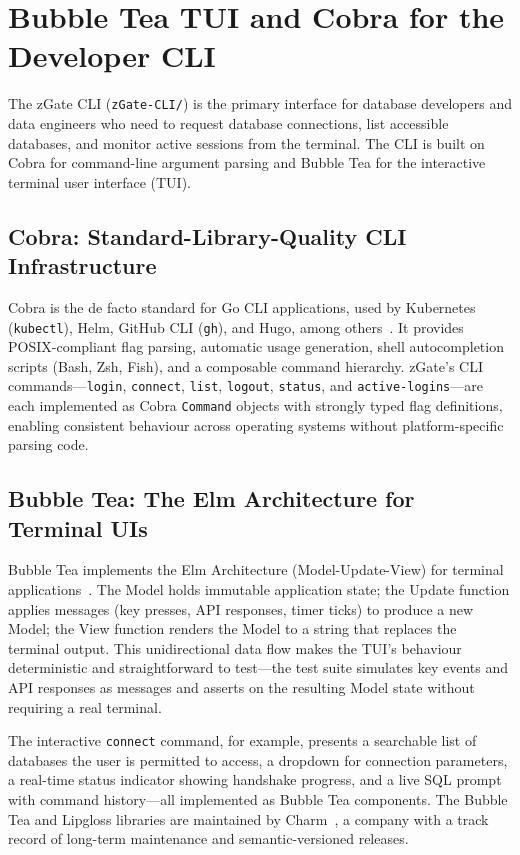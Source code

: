 \section{Bubble Tea TUI and Cobra for the Developer CLI}
\label{sec:cli}

The zGate CLI (\texttt{zGate-CLI/}) is the primary interface for database developers and data engineers who need to request database connections, list accessible databases, and monitor active sessions from the terminal. The CLI is built on Cobra for command-line argument parsing and Bubble Tea for the interactive terminal user interface (TUI).

\subsection{Cobra: Standard-Library-Quality CLI Infrastructure}

Cobra is the de facto standard for Go CLI applications, used by Kubernetes (\texttt{kubectl}), Helm, GitHub CLI (\texttt{gh}), and Hugo, among others~\cite{cobra-docs}. It provides POSIX-compliant flag parsing, automatic usage generation, shell autocompletion scripts (Bash, Zsh, Fish), and a composable command hierarchy. zGate's CLI commands---\texttt{login}, \texttt{connect}, \texttt{list}, \texttt{logout}, \texttt{status}, and \texttt{active-logins}---are each implemented as Cobra \texttt{Command} objects with strongly typed flag definitions, enabling consistent behaviour across operating systems without platform-specific parsing code.

\subsection{Bubble Tea: The Elm Architecture for Terminal UIs}

Bubble Tea implements the Elm Architecture (Model-Update-View) for terminal applications~\cite{bubbletea-docs}. The Model holds immutable application state; the Update function applies messages (key presses, API responses, timer ticks) to produce a new Model; the View function renders the Model to a string that replaces the terminal output. This unidirectional data flow makes the TUI's behaviour deterministic and straightforward to test---the test suite simulates key events and API responses as messages and asserts on the resulting Model state without requiring a real terminal.

The interactive \texttt{connect} command, for example, presents a searchable list of databases the user is permitted to access, a dropdown for connection parameters, a real-time status indicator showing handshake progress, and a live SQL prompt with command history---all implemented as Bubble Tea components. The Bubble Tea and Lipgloss libraries are maintained by Charm~\cite{bubbletea-docs}, a company with a track record of long-term maintenance and semantic-versioned releases.

